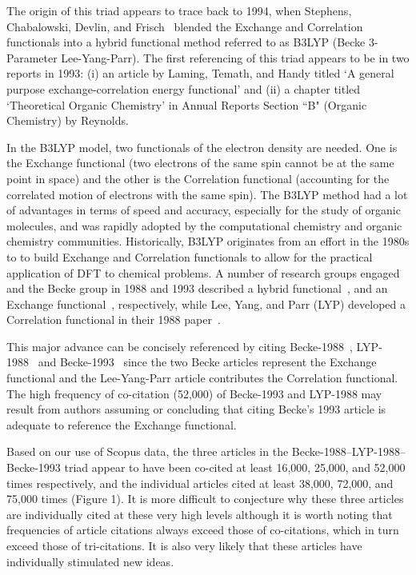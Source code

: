 \documentclass[11pt, oneside]{article}   	%
\begin{document}
The origin of this triad appears to trace back to 1994, when Stephens, Chabalowski, Devlin, and Frisch~\citep{stephens1994ab} blended the Exchange and Correlation functionals into a hybrid functional method referred to as B3LYP (Becke 3-Parameter Lee-Yang-Parr). The first referencing of this triad appears to be in two reports in 1993: (i) an article by Laming, Temath, and Handy\citep{laming1993} titled `A general purpose exchange‐correlation energy functional' and (ii) a chapter titled `Theoretical Organic Chemistry' in Annual Reports Section ``B" (Organic Chemistry) by Reynolds\citep{reynolds1993theoretical}.

In the B3LYP model, two functionals of the electron density are needed. One is the Exchange functional (two electrons of the same spin cannot be at the same point in space) and the other is the Correlation functional (accounting for the correlated motion of electrons with the same spin). The B3LYP method had a lot of advantages in terms of speed and accuracy, especially for the study of organic molecules, and was rapidly adopted by the computational chemistry and organic chemistry communities. Historically, B3LYP originates from an effort in the 1980s to to build Exchange and Correlation functionals to allow for the practical application of DFT to chemical problems. A number of research groups engaged and the Becke group in 1988 and 1993 described a hybrid functional~\citep{becke1988density}, and an Exchange functional~\citep{becke1993dft}, respectively, while Lee, Yang, and Parr (LYP) developed a Correlation functional in their 1988 paper~\citep{lyp1988}.  

This major advance can be concisely referenced by citing Becke-1988~\citep{becke1988density}, LYP-1988~\citep{lyp1988} and Becke-1993~\citep{becke1993dft} since the two Becke articles represent the Exchange functional and the Lee-Yang-Parr article contributes the Correlation functional. The high frequency of co-citation (52,000) of Becke-1993 and LYP-1988 may result from authors assuming or concluding that citing Becke's 1993 article is adequate to reference the Exchange functional. 

Based on our use of Scopus data, the three articles in the Becke-1988--LYP-1988--Becke-1993 triad appear to have been co-cited at least 16,000, 25,000, and 52,000 times respectively, and the individual articles cited at least 38,000, 72,000, and 75,000 times (Figure 1). It is more difficult to conjecture why these three articles are individually cited at these very high levels although it is worth noting that  frequencies of article citations always exceed those of co-citations, which in turn exceed those of tri-citations. It is also very likely that these articles have individually stimulated new ideas.
\end{document}
